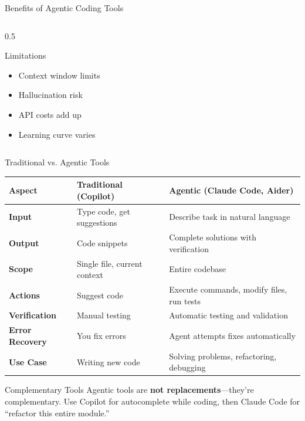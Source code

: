 \documentclass[aspectratio=169,11pt]{beamer}
\begin{document}
\begin{frame}{Benefits of Agentic Coding Tools}
\begin{columns}[T]
\begin{column}{0.5\textwidth}
            \begin{alertblock}{Limitations}
                \begin{itemize}
                    \item Context window limits
                    \item Hallucination risk
                    \item API costs add up
                    \item Learning curve varies
                \end{itemize}
            \end{alertblock}
        \end{column}
    \end{columns}

\end{frame}

\begin{frame}{Traditional vs. Agentic Tools}
    \begin{center}
        \small
        \begin{tabular}{@{}l p{4.5cm} p{5cm}@{}}
            \toprule
            \textbf{Aspect} & \textbf{Traditional (Copilot)} & \textbf{Agentic (Claude Code, Aider)} \\
            \midrule
            \textbf{Input} & Type code, get suggestions & Describe task in natural language \\
            \textbf{Output} & Code snippets & Complete solutions with verification \\
            \textbf{Scope} & Single file, current context & Entire codebase \\
            \textbf{Actions} & Suggest code & Execute commands, modify files, run tests \\
            \textbf{Verification} & Manual testing & Automatic testing and validation \\
            \textbf{Error Recovery} & You fix errors & Agent attempts fixes automatically \\
            \textbf{Use Case} & Writing new code & Solving problems, refactoring, debugging \\
            \bottomrule
        \end{tabular}
    \end{center}

    \vspace{0.3cm}
    \begin{exampleblock}{Complementary Tools}
        Agentic tools are \textbf{not replacements}---they're complementary. Use Copilot for autocomplete while coding, then Claude Code for ``refactor this entire module.''
    \end{exampleblock}

\end{frame}
\end{document}

